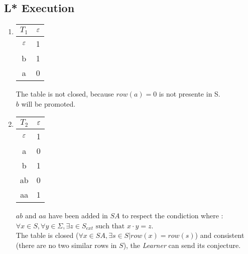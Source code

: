 \subsection{L* Execution}
\begin{enumerate}
  \item \begin{minipage}{0.3\textwidth}
          \begin{tabular}{c||c}
            $T_1$ & $\varepsilon$ \\
            \hline\hline
            $\varepsilon$  & 1    \\
            \hline\hline
            b     & 1    \\
            a     & 0    \\
          \end{tabular}
        \end{minipage} \quad
        \begin{minipage}{0.6\textwidth}
          The table is not closed, because $row(a) = 0$ is not presente in S. \\
          $b$ will be promoted.
        \end{minipage}
  \item \begin{minipage}{0.3\textwidth}
          \begin{tabular}{c||c}
            $T_2$ & $\varepsilon$ \\
            \hline\hline
            $\varepsilon$  & 1    \\
            a     & 0    \\
            \hline\hline
            b     & 1    \\
            ab    & 0    \\
            aa    & 1    \\
          \end{tabular}
        \end{minipage}\quad
        \begin{minipage}{0.6\textwidth}
          $ab$ and $aa$ have been added in $SA$ to respect the condiction where : $\forall x \in S, \forall y \in \Sigma, \exists z \in S_{ext} \text{ such that } x \cdot y = z $.\\
          The table is closed ($\forall x \in SA, \exists s \in S | row(x) = row(s)$) and consistent (there are no two similar rows in $S$), the \textit{Learner} can send its conjecture.
        \end{minipage}


\end{enumerate}
